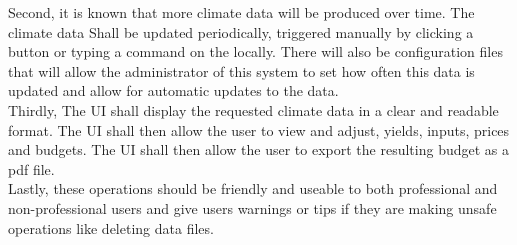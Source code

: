 \documentclass[letterpaper,10pt]{article}
\begin{document}
    Second, it is known that more climate data will be produced over time. The climate data Shall be updated periodically, triggered manually by clicking a button or typing a command on the locally. There will also be configuration files that will allow the administrator of this system to set how often this data is updated and allow for automatic updates to the data.\\
    
    Thirdly, The UI shall display the requested climate data in a clear and readable format. The UI shall then allow the user to view and adjust, yields, inputs, prices and budgets. The UI shall then allow the user to export the resulting budget as a pdf file.\\
    
    Lastly, these operations should be friendly and useable to both professional and non-professional users and give users warnings or tips if they are making unsafe operations like deleting data files.\\
\end{document}
